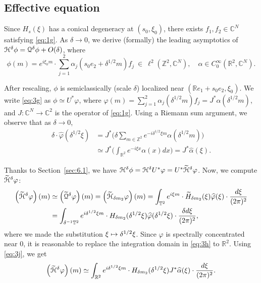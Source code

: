 \documentclass[11pt]{article}
\numberwithin{equation}{section}
\let\pazocal\EuScript
\def\mto{\mathchoice{\longmapsto}{\mapsto}{\mapsto}{\mapsto}}
\theoremstyle{definition}
\newcommand{\QQ}{{\pazocal{Q}}}
\newcommand{\HH}{\pazocal{H}}
\newcommand{\tHH}{\widetilde{\HH}{}}
\newcommand{\tQQ}{\widetilde{\QQ}{}}
\newcommand{\C}{\mathbb{C}}
\newcommand{\R}{\mathbb{R}}
\newcommand{\Z}{\mathbb{Z}}
\newcommand{\Tt}{{\mathbb{T}}}
\let\az\alpha
\let\vp\varphi
\newcommand{\tH}{{\widetilde{H}}}
\newcommand{\hvp}{{\widehat{\vp}}}
\newcommand{\haz}{{\widehat{\az}}}
\begin{document}
\subsection{Effective equation} Since $H_s(\xi)$ has a conical degeneracy at $(s_0,\xi_0)$, there exists $f_1, f_2 \in \C^N$ satisfying \eqref{eq:1g}. As $\delta \to 0$, we derive (formally) the leading asymptotics of $\HH^\delta \phi = \QQ^\delta \phi + O(\delta)$, where
\begin{equation}\label{eq:3g}
\phi(m) = e^{i\xi_0 m} \cdot \sum_{j=1}^2 \az_j(s_0 e_2+\delta^{1/2} m) f_j \ \in \ \ell^2(\Z^2,\C^N), \quad \az \in C_0^\infty(\R^2,\C^N).
\end{equation}

After rescaling, $\phi$ is semiclassically (scale $\delta$) localized near $(\R e_1 + s_0e_2,\xi_0)$.
We write \eqref{eq:3g} as $\phi \simeq U^* \vp$, where $\vp(m) = \sum_{j=1}^2 \az_j(\delta^{1/2} m) f_j = J^* \az(\delta^{1/2} m)$,
and $J : \C^N \to \C^2$ is the operator of \eqref{eq:1g}. Using a Riemann sum argument, we observe that as $\delta \to 0$,
\begin{equation}\label{eq:3j}
\begin{split}
\delta \cdot \hvp(\delta^{1/2} \xi) &= J^* \biggl( \delta \sum_{m \in \Z^2} e^{-i \delta^{1/2} \xi m} \az(\delta^{1/2} m) \biggr)\\
&\simeq J^* \biggl( \int_{\R^2} e^{-i \xi x} \az(x) dx\biggr) = J^* \haz(\xi).
\end{split}
\end{equation}

Thanks to Section~\ref{sec:6.1}, we have $\HH^\delta \phi = \HH^\delta U^* \vp = U^* \tHH^\delta \vp$. Now, we compute $\tHH^\delta \vp$:
\begin{equation}\label{eq:3h}
\begin{split}
\left(\tHH^\delta \vp \right)(m) &\simeq \left(\tQQ^\delta \vp\right)(m) = \left(\tHH_{\delta m_2} \vp\right)(m) = \int_{\Tt^2} e^{i\xi m} \cdot \tH_{\delta m_2}(\xi) \hvp(\xi) \cdot \dfrac{d\xi}{(2\pi)^2}
\\
&= \int_{\delta^{-1} \Tt^2} e^{i\delta^{1/2} \xi m} \cdot H_{\delta m_2}(\delta^{1/2} \xi) \hvp(\delta^{1/2} \xi) \cdot \dfrac{\delta d\xi}{(2\pi)^2},
\end{split}
\end{equation}
where we made the substitution $\xi \mto \delta^{1/2} \xi$. Since $\vp$ is spectrally concentrated near $0$, it is reasonable to replace the integration domain in \eqref{eq:3h} to $\R^2$. Using \eqref{eq:3j}, we get
\begin{equation}\label{eq:3m}
\left(\tHH^\delta \vp \right)(m) \simeq \int_{\R^2} e^{i\delta^{1/2} \xi m} \cdot H_{\delta m_2}(\delta^{1/2} \xi) J^* \haz(\xi) \cdot \dfrac{d\xi}{(2\pi )^2}.
\end{equation}
\end{document}
